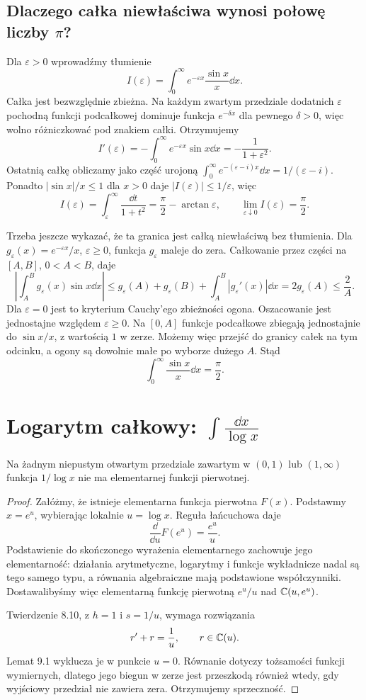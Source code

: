 \subsection{Dlaczego całka niewłaściwa wynosi połowę liczby $\pi$?}

Dla $\varepsilon>0$ wprowadźmy tłumienie
\[
I(\varepsilon)=\int_0^\infty e^{-\varepsilon x}\frac{\sin x}{x}\dd x.
\]
Całka jest bezwzględnie zbieżna. Na każdym zwartym przedziale dodatnich $\varepsilon$ pochodną funkcji podcałkowej dominuje funkcja $e^{-\delta x}$ dla pewnego $\delta>0$, więc wolno różniczkować pod znakiem całki. Otrzymujemy
\[
I'(\varepsilon)=-\int_0^\infty e^{-\varepsilon x}\sin x\dd x
=-\frac1{1+\varepsilon^2}.
\]
Ostatnią całkę obliczamy jako część urojoną $\int_0^\infty e^{-(\varepsilon-i)x}\dd x=1/(\varepsilon-i)$. Ponadto $|\sin x|/x\le1$ dla $x>0$ daje $|I(\varepsilon)|\le1/\varepsilon$, więc
\[
I(\varepsilon)=\int_\varepsilon^\infty\frac{\dd t}{1+t^2}
=\frac\pi2-\arctan\varepsilon,
\qquad\lim_{\varepsilon\downarrow0}I(\varepsilon)=\frac\pi2.
\]

Trzeba jeszcze wykazać, że ta granica jest całką niewłaściwą bez tłumienia. Dla $g_\varepsilon(x)=e^{-\varepsilon x}/x$, $\varepsilon\ge0$, funkcja $g_\varepsilon$ maleje do zera. Całkowanie przez części na $[A,B]$, $0<A<B$, daje
\[
\left|\int_A^B g_\varepsilon(x)\sin x\dd x\right|
\le g_\varepsilon(A)+g_\varepsilon(B)
+\int_A^B|g_\varepsilon'(x)|\dd x
=2g_\varepsilon(A)\le\frac2A.
\]
Dla $\varepsilon=0$ jest to kryterium Cauchy'ego zbieżności ogona. Oszacowanie jest jednostajne względem $\varepsilon\ge0$. Na $[0,A]$ funkcje podcałkowe zbiegają jednostajnie do $\sin x/x$, z wartością $1$ w zerze. Możemy więc przejść do granicy całek na tym odcinku, a ogony są dowolnie małe po wyborze dużego $A$. Stąd
\[
\int_0^\infty\frac{\sin x}{x}\dd x=\frac\pi2.
\]

\section{Logarytm całkowy: $\int \frac{\dd x}{\log x}$}

\begin{twierdzenie}
Na żadnym niepustym otwartym przedziale zawartym w $(0,1)$ lub $(1,\infty)$ funkcja $1/\log x$ nie ma elementarnej funkcji pierwotnej.
\end{twierdzenie}
\begin{proof}
Załóżmy, że istnieje elementarna funkcja pierwotna $F(x)$. Podstawmy $x=e^u$, wybierając lokalnie $u=\log x$. Reguła łańcuchowa daje
\[
\frac{\dd}{\dd u}F(e^u)=\frac{e^u}{u}.
\]
Podstawienie do skończonego wyrażenia elementarnego zachowuje jego elementarność: działania arytmetyczne, logarytmy i funkcje wykładnicze nadal są tego samego typu, a równania algebraiczne mają podstawione współczynniki. Dostawalibyśmy więc elementarną funkcję pierwotną $e^u/u$ nad $\mathbb{C}(u,e^u)$.

Twierdzenie 8.10, z $h=1$ i $s=1/u$, wymaga rozwiązania
\[
r'+r=\frac1u,\qquad r\in\mathbb{C}(u).
\]
Lemat 9.1 wyklucza je w punkcie $u=0$. Równanie dotyczy tożsamości funkcji wymiernych, dlatego jego biegun w zerze jest przeszkodą również wtedy, gdy wyjściowy przedział nie zawiera zera. Otrzymujemy sprzeczność.
\end{proof}

